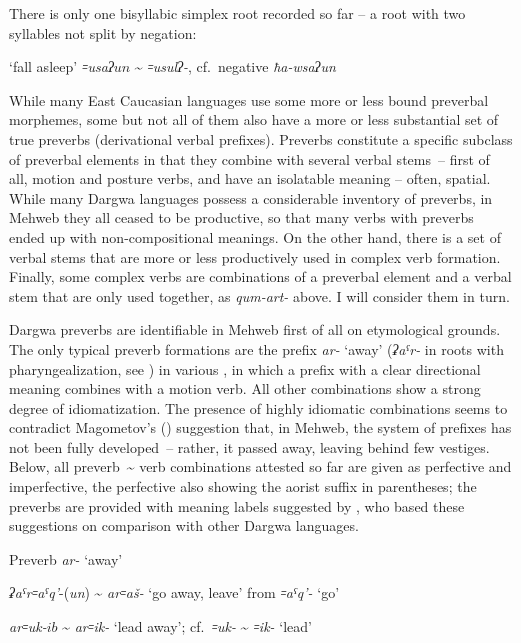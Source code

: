 \documentclass[output=paper]{langsci/langscibook}
\begin{document}
There is only one bisyllabic simplex root recorded so far – a root with
two syllables not split by negation:

\ea %
`fall asleep' \emph{꞊usaʔ\(un\)} \textasciitilde{} \emph{꞊usulʔ-},
cf.\ negative \emph{ħa-wsaʔun}
\z

While many East Caucasian languages use some more or less bound
preverbal morphemes, some but not all of them also have a more or less
substantial set of true preverbs (derivational verbal prefixes).
Preverbs constitute a specific subclass of preverbal elements in that
they combine with several verbal stems~– first of all, motion and
posture verbs, and have an isolatable meaning – often, spatial. While
many Dargwa languages possess a considerable inventory of preverbs, in
Mehweb they all ceased to be productive, so that many verbs with
preverbs ended up with non-compositional meanings. On the other hand,
there is a set of verbal stems that are more or less productively used
in complex verb formation. Finally, some complex verbs are combinations
of a preverbal element and a verbal stem that are only used together, as
\emph{qum-art-} above. I will consider them in turn.

Dargwa preverbs are identifiable in Mehweb first of all on etymological
grounds. The only typical preverb formations are the prefix \emph{ar-}
`away' (\emph{ʡaˤr-} in roots with pharyngealization, see \citealt{moroz2019}) in
various , in which a prefix with a clear directional meaning
combines with a motion verb. All other combinations show a strong degree
of idiomatization. The presence of highly idiomatic combinations seems
to contradict Magometov's (\citeyear[74]{magometov1982}) suggestion that, in Mehweb, the
system of prefixes has not been fully developed~– rather, it passed
away, leaving behind few vestiges. Below, all
preverb~\textasciitilde{} verb combinations attested so far are given as
perfective and imperfective, the perfective also showing the aorist
suffix in parentheses; the preverbs are provided with meaning labels
suggested by \citet[74–80]{magometov1982}, who based these suggestions on
comparison with other Dargwa languages.

\ea %
Preverb \emph{ar-} `away'

\ea %
\emph{ʡaˤr꞊aˤq'}-(\emph{un}) \textasciitilde{}
\emph{ar꞊aš-} `go away, leave' from \emph{꞊aˤq'-} `go'

\ex %
\emph{ar꞊uk-\(ib\)} \textasciitilde{} \emph{ar꞊ik-}
`lead away'; cf.\ \emph{꞊uk-} \textasciitilde{} \emph{꞊ik-} `lead'
\end{document}
